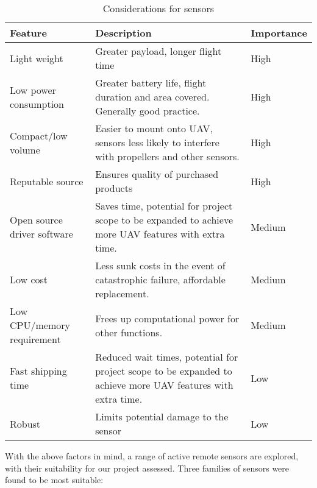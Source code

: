 \documentclass[capstone_report.tex]{subfiles}
\begin{document}
\begin{table}[H]
\centering
\begin{tabular}{lp{6cm}p{3cm}}
\toprule
  Feature                                   & Description & Importance\\ 
\midrule
Light weight                                   & Greater payload, longer flight time & High \\
Low power consumption &	Greater battery life, flight duration and area covered. Generally good practice.	&High\\
Compact/low volume	&Easier to mount onto UAV, sensors less likely to interfere with propellers and other sensors.	&High\\
Reputable source	&Ensures quality of purchased products	&High\\
Open source driver software	&Saves time, potential for project scope to be expanded to achieve more UAV features with extra time.& Medium\\
Low cost	&Less sunk costs in the event of catastrophic failure, affordable replacement.	&Medium\\
Low CPU/memory requirement	&Frees up computational power for other functions.	&Medium\\
Fast shipping time &Reduced wait times, potential for project scope to be expanded to achieve more UAV features with extra time.	&Low\\
Robust	&Limits potential damage to the sensor	&Low \\
\bottomrule
\end{tabular}
\caption{Considerations for sensors\label{tab:sensors}}
\end{table}


With the above factors in mind, a range of active remote sensors are explored, with their suitability for our project assessed. Three families of sensors were found to be most suitable:
\end{document}

